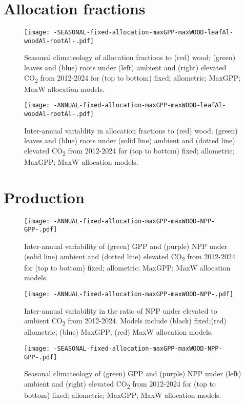 \graphicspath{{../plots/figs/}}


\section{Allocation fractions}

\begin{figure}[h]
  \centering
    \texttt{[image: -SEASONAL-fixed-allocation-maxGPP-maxWOOD-leafAl-woodAl-rootAl-.pdf]}
    \caption{Seasonal climateology of allocation fractions to (red) wood; (green) leaves and (blue) roots under (left) ambient and (right) elevated CO\textsubscript{2} from 2012-2024 for (top to bottom) fixed; allometric; MaxGPP; MaxW allocation models.}
\end{figure}

\begin{figure}[h!]
  \centering
    \texttt{[image: -ANNUAL-fixed-allocation-maxGPP-maxWOOD-leafAl-woodAl-rootAl-.pdf]}
    \caption{Inter-annual variablity in allocation fractions to (red) wood; (green) leaves and (blue) roots under (solid line) ambient and (dotted line) elevated CO\textsubscript{2} from 2012-2024 for (top to bottom) fixed; allometric; MaxGPP; MaxW allocation models.}
\end{figure}

\section{Production}

\begin{figure}[h]
  \centering
    \texttt{[image: -ANNUAL-fixed-allocation-maxGPP-maxWOOD-NPP-GPP-.pdf]}
    \caption{Inter-annual variability of (green) GPP and (purple) NPP under (solid line) ambient and (dotted line) elevated CO\textsubscript{2} from 2012-2024 for (top to bottom) fixed; allometric; MaxGPP; MaxW allocation models.}
\end{figure}

\begin{figure}[h]
  \centering
    \texttt{[image: -ANNUAL-fixed-allocation-maxGPP-maxWOOD-NPP-.pdf]}
    \caption{Inter-annual variability in the ratio of NPP under elevated to ambient CO\textsubscript{2} from 2012-2024. Models include (black) fixed;(red) allometric; (blue) MaxGPP; (red) MaxW allocation models.}
\end{figure}

\begin{figure}[h]
  \centering
    \texttt{[image: -SEASONAL-fixed-allocation-maxGPP-maxWOOD-NPP-GPP-.pdf]}
    \caption{Seasonal climateology of (green) GPP and (purple) NPP under  (left) ambient and (right) elevated CO\textsubscript{2} from 2012-2024 for (top to bottom) fixed; allometric; MaxGPP; MaxW allocation models.}
\end{figure}

